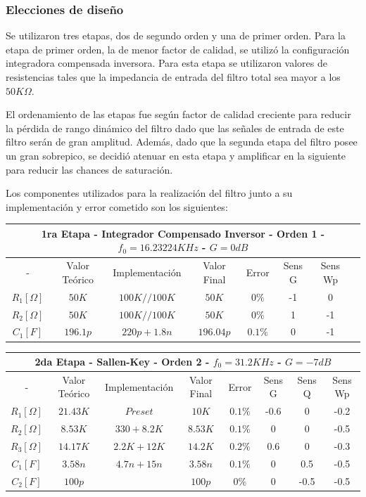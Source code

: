 \subsubsection{Elecciones de diseño}

Se utilizaron tres etapas, dos de segundo orden y una de primer orden. Para la etapa de primer orden, la de menor factor de calidad, se utilizó la configuración integradora compensada inversora. Para esta etapa se utilizaron valores de resistencias tales que la impedancia de entrada del filtro total sea mayor a los $50K\Omega$.

El ordenamiento de las etapas fue según factor de calidad creciente para reducir la pérdida de rango dinámico del filtro dado que las señales de entrada de este filtro serán de gran amplitud. Además, dado que la segunda etapa del filtro posee un gran sobrepico, se decidió atenuar en esta etapa y amplificar en la siguiente para reducir las chances de saturación.

Los componentes utilizados para la realización del filtro junto a su implementación y error cometido son los siguientes:

\begin{table}[H]
\centering
\begin{tabular}{@{}cccccccc@{}}
\multicolumn{8}{c}{1ra Etapa - Integrador Compensado Inversor - Orden 1 - $f_0 = 16.23224KHz$ - $G=0dB$} \\ \midrule
- & Valor Teórico & Implementación & Valor Final & Error & Sens G  & Sens Wp \\ \midrule
$R_1 [\Omega]$ & $50K$ & $100K//100K$ & $50K$ & $0\%$ & -1 & 0 \\
$R_2 [\Omega]$ & $50K$ & $100K//100K$ & $50K$ & $0\%$ & 1 & -1 \\
$C_1 [F]$ & $196.1p$ & $220p+1.8n$ & $196.04p$ & $0.1\%$ & 0 & -1 \\
\bottomrule
\end{tabular}
\end{table}

\begin{table}[H]
\centering
\begin{tabular}{@{}cccccccc@{}}
\multicolumn{8}{c}{2da Etapa - Sallen-Key - Orden 2 - $f_0 = 31.2KHz$ - $G=-7dB$} \\ \midrule
- & Valor Teórico & Implementación & Valor Final & Error & Sens G & Sens Q & Sens Wp \\ \midrule
$R_1 [\Omega]$ & $21.43K$ & $Preset$ & $10K$ & $0.1\%$ & -0.6 & 0 & -0.2 \\
$R_2 [\Omega]$ & $8.53K$ & $330+8.2K$ & $8.53K$ & $0.1\%$ & 0 & 0 & -0.5 \\
$R_3 [\Omega]$ & $14.17K$ & $2.2K+12K$ & $14.2K$ & $0.2\%$ & 0.6 & 0 & -0.3 \\
$C_1 [F]$ & $3.58n$ & $4.7n+15n$ & $3.58n$ & $0.1\%$ & 0 & 0.5 & -0.5 \\
$C_2 [F]$ & $100p$ &  & $100p$ & $0\%$ & 0 & -0.5 & -0.5 \\ \bottomrule
\end{tabular}
\end{table}
 
